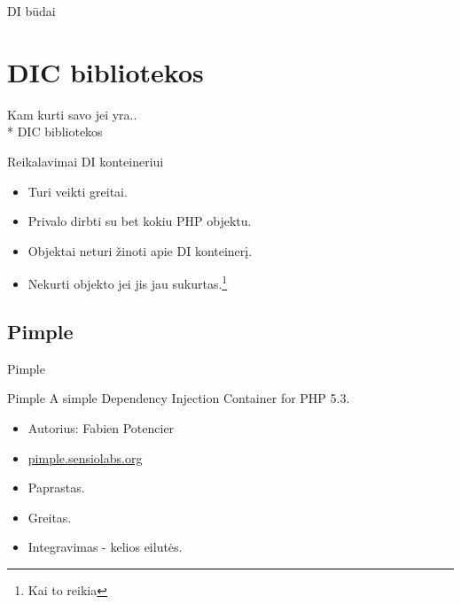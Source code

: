 \documentclass[12pt,a4paper]{beamer}
\begin{document}
\begin{frame}[fragile]{DI būdai}
\end{frame}

\section{DIC bibliotekos}
\begin{frame}
	\begin{center}
        {\footnotesize Kam kurti savo jei yra..}\\*
        \vskip0.5cm
        {\Huge DIC bibliotekos}
	\end{center}
\end{frame}

\begin{frame}{Reikalavimai DI konteineriui}
    \begin{itemize}
        \item Turi veikti greitai.
        \item Privalo dirbti su bet kokiu PHP objektu.
        \item Objektai neturi žinoti apie DI konteinerį.
        \item Nekurti objekto jei jis jau sukurtas.\footnote{Kai to reikia}
    \end{itemize}
\end{frame}

\subsection{Pimple}
\begin{frame}
	\begin{center}
        {\Huge Pimple}
	\end{center}
\end{frame}

\begin{frame}{Pimple}
    A simple Dependency Injection Container for PHP 5.3.
    \begin{itemize}
        \item Autorius: Fabien Potencier
        \item \url{pimple.sensiolabs.org}
        \item Paprastas.
        \item Greitas.
        \item Integravimas - kelios eilutės.
    \end{itemize}
\end{frame}
\end{document}
